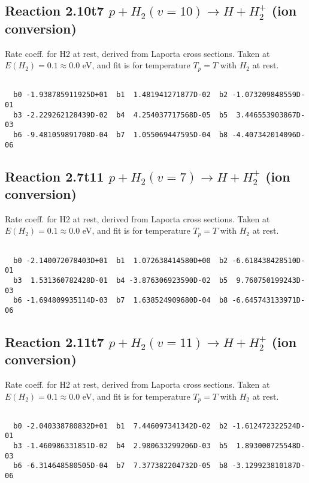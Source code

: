 \documentclass[12pt,dvipdfmx]{article}
\begin{document}
\newpage
\subsection{
Reaction 2.10t7
$ p + H_2(v=10) \rightarrow H + H_2^+$ (ion conversion)
}
Rate coeff. for H2 at rest, derived from Laporta cross sections.
Taken at $E(H_2) = 0.1 \approx 0.0$ eV,  and fit is for temperature $T_p=T$ with $H_2$ at rest.

\begin{small}\begin{verbatim}

  b0 -1.938785911925D+01  b1  1.481941271877D-02  b2 -1.073209848559D-01
  b3 -2.229262128439D-02  b4  4.254037717568D-05  b5  3.446553903867D-03
  b6 -9.481059891708D-04  b7  1.055069447595D-04  b8 -4.407342014096D-06

\end{verbatim}\end{small}

\newpage
\subsection{
Reaction 2.7t11
$ p + H_2(v=7) \rightarrow H + H_2^+$ (ion conversion)
}
Rate coeff. for H2 at rest, derived from Laporta cross sections.
Taken at $E(H_2) = 0.1 \approx 0.0$ eV,  and fit is for temperature $T_p=T$ with $H_2$ at rest.

\begin{small}\begin{verbatim}

  b0 -2.140072078403D+01  b1  1.072638414580D+00  b2 -6.618438428510D-01
  b3  1.531360782428D-01  b4 -3.876306923590D-02  b5  9.760750199243D-03
  b6 -1.694809935114D-03  b7  1.638524909680D-04  b8 -6.645743133971D-06

\end{verbatim}\end{small}

\newpage
\subsection{
Reaction 2.11t7
$ p + H_2(v=11) \rightarrow H + H_2^+$ (ion conversion)
}
Rate coeff. for H2 at rest, derived from Laporta cross sections.
Taken at $E(H_2) = 0.1 \approx 0.0$ eV,  and fit is for temperature $T_p=T$ with $H_2$ at rest.

\begin{small}\begin{verbatim}

  b0 -2.040338780832D+01  b1  7.446097341342D-02  b2 -1.612472322524D-01
  b3 -1.460986331851D-02  b4  2.980633299206D-03  b5  1.893000725548D-03
  b6 -6.314648580505D-04  b7  7.377382204732D-05  b8 -3.129923810187D-06

\end{verbatim}\end{small}
\end{document}
